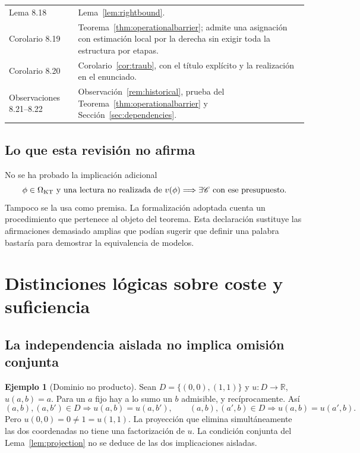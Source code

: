 \documentclass[11pt,a4paper]{article}
\numberwithin{equation}{section}
\theoremstyle{definition}
\newtheorem{example}[theorem]{Ejemplo}
\theoremstyle{remark}
\newcommand{\R}{\mathbb R}
\begin{document}
\begin{longtable}{@{}p{}p{}@{}}
Lema 8.18 & Lema~\ref{lem:rightbound}.\\[3pt]
Corolario 8.19 & Teorema~\ref{thm:operationalbarrier}; admite una asignación con estimación local por la derecha sin exigir toda la estructura por etapas.\\[3pt]
Corolario 8.20 & Corolario~\ref{cor:traub}, con el título explícito y la realización en el enunciado.\\[3pt]
Observaciones 8.21--8.22 & Observación~\ref{rem:historical}, prueba del Teorema~\ref{thm:operationalbarrier} y Sección~\ref{sec:dependencies}.\\
\bottomrule
\end{longtable}

\subsection{Lo que esta revisión no afirma}
No se ha probado la implicación adicional
\[
\phi\in\Omega_{\rm KT}\text{ y una lectura no realizada de }v(\phi)
\Longrightarrow\exists\mathscr C\text{ con ese presupuesto}.
\]
Tampoco se la usa como premisa. La formalización adoptada cuenta un procedimiento que pertenece al objeto del teorema. Esta declaración sustituye las afirmaciones demasiado amplias que podían sugerir que definir una palabra bastaría para demostrar la equivalencia de modelos.

\clearpage
\section{Distinciones lógicas sobre coste y suficiencia}\label{app:costlogic}

\subsection{La independencia aislada no implica omisión conjunta}
\begin{example}[Dominio no producto]\label{ex:jointomission}
Sean $D=\{(0,0),(1,1)\}$ y $u:D\to\R$, $u(a,b)=a$. Para un $a$ fijo hay a lo sumo un $b$ admisible, y recíprocamente. Así
\[
(a,b),(a,b')\in D\Longrightarrow u(a,b)=u(a,b'),
\qquad
(a,b),(a',b)\in D\Longrightarrow u(a,b)=u(a',b).
\]
Pero $u(0,0)=0\ne1=u(1,1)$. La proyección que elimina simultáneamente las dos coordenadas no tiene una factorización de $u$. La condición conjunta del Lema~\ref{lem:projection} no se deduce de las dos implicaciones aisladas.
\end{example}
\end{document}
